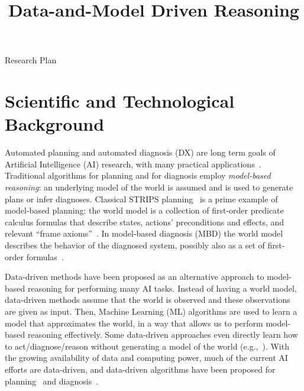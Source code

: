 \documentclass[12pt]{article}
\newcommand{\note}[1]{\textbf{\textit{#1}}}
\begin{document}
\title{Data-and-Model Driven Reasoning}

\begin{center}
\LARGE{Research Plan}
\end{center}

\section{Scientific and Technological Background}


Automated planning and automated diagnosis (DX) are long term goals of Artificial Intelligence (AI) research, with many practical applications~\cite{abreu2011simultaneousDebugging,fox2011automatic,niggemann10model,williams96,robinson2014cost,ruml2011line,Zamir2014UsingMD}. Traditional algorithms for planning and for diagnosis employ {\em model-based reasoning}: an underlying model of the world is assumed and is used to generate plans or infer diagnoses. Classical STRIPS planning~\cite{fikes1971strips} is a prime example of model-based planning: the world model is a collection of first-order predicate calculus formulas that describe states, actions' preconditions and effects, and relevant ``frame axioms''~\cite{ghallab2004automated}. In model-based diagnosis (MBD) the world model describes the behavior of the diagnosed system, 
possibly also as a set of first-order formulas~\cite{reiter1987theory,deKleer1987diagnosing}. 



Data-driven methods have been proposed as an alternative approach to model-based reasoning for performing many AI tasks. %
Instead of having a world model, data-driven methods  assume that the world is observed and these observations are given as input. Then, Machine Learning (ML) algorithms are used to learn a model that approximates the world, in a way that allows us to perform model-based reasoning effectively. Some data-driven approaches even directly learn how to act/diagnose/reason without generating a model of the world (e.g.,~\cite{kearns2002POMDPsample}). 
With the growing availability of data and computing power, much of the current AI efforts are data-driven,
and data-driven algorithms have been proposed for  planning~\cite{fern2011first,juba2016jmlr} and diagnosis~\cite{keren2011model,qin2012survey}.
\end{document}
